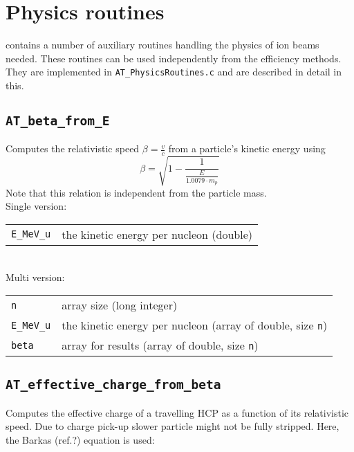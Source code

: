 
\chapter{Physics routines}

\la{} contains a number of auxiliary routines handling the physics of ion beams needed. These routines can be used independently from the efficiency methods. They are implemented in \texttt{AT\_PhysicsRoutines.c} and are described in detail in this.

\section{\texttt{AT\_beta\_from\_E}}

Computes the relativistic speed $\beta=\frac{v}{c}$ from a particle's kinetic energy using
\begin{equation}
\beta = \sqrt{1 - \frac{1}{\frac{E}{1.0079\cdot m_p}}}
\end{equation}
Note that this relation is independent from the particle mass.\\

Single version:\\
\begin{tabular}{l l}
\texttt{E\_MeV\_u} & the kinetic energy per nucleon (double) \\
\end{tabular}\\

Multi version:\\
\begin{tabular}{l l}
\texttt{n} & array size (long integer) \\
\texttt{E\_MeV\_u} & the kinetic energy per nucleon (array of double, size \texttt{n}) \\
\texttt{beta} & array for results (array of double, size \texttt{n}) \\
\end{tabular}


\section{\texttt{AT\_effective\_charge\_from\_beta}}

Computes the effective charge of a travelling HCP as a function of its relativistic speed. Due to charge pick-up slower particle might not be fully stripped. Here, the Barkas (ref.?) equation is used:

